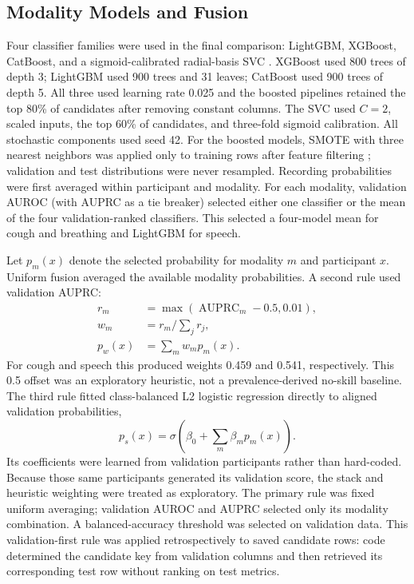 \documentclass[conference]{IEEEtran}
\begin{document}
\subsection{Modality Models and Fusion}

Four classifier families were used in the final comparison: LightGBM,
XGBoost, CatBoost, and a sigmoid-calibrated radial-basis SVC
\cite{cortes1995svm,ke2017lightgbm,chen2016xgboost,prokhorenkova2018catboost}.
XGBoost used 800 trees of depth 3; LightGBM used 900 trees and 31 leaves;
CatBoost used 900 trees of depth 5. All three used learning rate 0.025 and the
boosted pipelines retained the top 80\% of candidates after removing constant
columns. The SVC used $C=2$, scaled inputs, the top 60\% of candidates, and
three-fold sigmoid calibration. All stochastic components used seed 42.
For the boosted models, SMOTE with three nearest neighbors was applied only to
training rows after feature filtering \cite{chawla2002smote}; validation and
test distributions were never resampled. Recording probabilities were first
averaged within participant and modality. For each modality, validation AUROC
(with AUPRC as a tie breaker) selected either one classifier or the mean of the
four validation-ranked classifiers. This selected a four-model mean for cough
and breathing and LightGBM for speech.

Let $p_m(x)$ denote the selected probability for modality $m$ and participant
$x$. Uniform fusion averaged the available modality probabilities. A second
rule used validation AUPRC:
\begin{equation}
\begin{aligned}
r_m&=\max(\operatorname{AUPRC}_m-0.5,0.01),\\
w_m&=r_m\big/\textstyle\sum_j r_j,\\
p_w(x)&=\textstyle\sum_m w_m p_m(x).
\end{aligned}
\end{equation}
For cough and speech this produced weights 0.459 and 0.541, respectively. This
0.5 offset was an exploratory heuristic, not a prevalence-derived no-skill
baseline. The third rule fitted class-balanced L2 logistic regression directly
to aligned validation probabilities,
\begin{equation}
p_s(x)=\sigma\!\left(\beta_0+\sum_m\beta_mp_m(x)\right).
\end{equation}
Its coefficients were learned from validation participants rather than
hard-coded. Because those same participants generated its validation score,
the stack and heuristic weighting were treated as exploratory. The primary
rule was fixed uniform averaging; validation AUROC and AUPRC selected only its
modality combination. A balanced-accuracy threshold was selected on validation
data. This validation-first rule was applied retrospectively to saved candidate
rows: code determined the candidate key from validation columns and then
retrieved its corresponding test row without ranking on test metrics.
\end{document}
